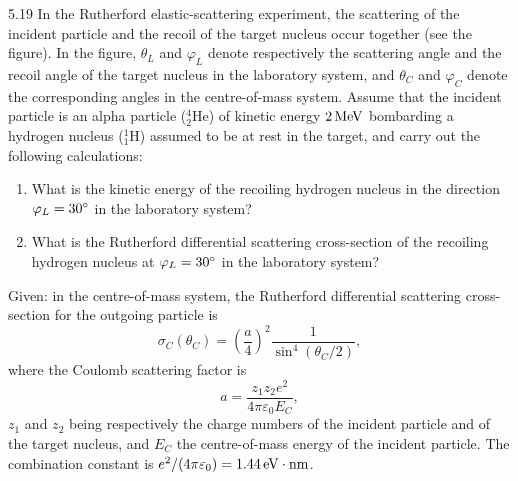 \begin{problem}{5.19}
In the Rutherford elastic-scattering experiment, the scattering of the incident particle and the recoil of the target nucleus occur together (see the figure). In the figure, $\theta_L$ and $\varphi_L$ denote respectively the scattering angle and the recoil angle of the target nucleus in the laboratory system, and $\theta_C$ and $\varphi_C$ denote the corresponding angles in the centre-of-mass system. Assume that the incident particle is an alpha particle ($^{4}_{2}\mathrm{He}$) of kinetic energy $2\,\mathrm{MeV}$ bombarding a hydrogen nucleus ($^{1}_{1}\mathrm{H}$) assumed to be at rest in the target, and carry out the following calculations:
\begin{enumerate}[label=(\arabic*),leftmargin=2.2em,itemsep=1pt,topsep=2pt]
\item What is the kinetic energy of the recoiling hydrogen nucleus in the direction $\varphi_L = 30^{\circ}$ in the laboratory system?
\item What is the Rutherford differential scattering cross-section of the recoiling hydrogen nucleus at $\varphi_L = 30^{\circ}$ in the laboratory system?
\end{enumerate}
Given: in the centre-of-mass system, the Rutherford differential scattering cross-section for the outgoing particle is
\[
\sigma_C(\theta_C) = \left(\frac{a}{4}\right)^2 \frac{1}{\sin^4(\theta_C/2)},
\]
where the Coulomb scattering factor is
\[
a = \frac{z_1z_2e^2}{4\pi\varepsilon_0E_C},
\]
$z_1$ and $z_2$ being respectively the charge numbers of the incident particle and of the target nucleus, and $E_C$ the centre-of-mass energy of the incident particle. The combination constant is $e^2/(4\pi\varepsilon_0) = 1.44\,\mathrm{eV\cdot nm}$.
\end{problem}


